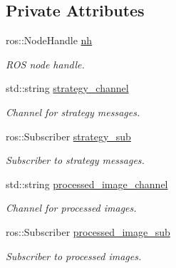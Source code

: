 \subsection*{Private Attributes}
\begin{DoxyCompactItemize}
\item 
\mbox{\label{classMappingNode_a139d9714856342de62b712b6e114a2ea}} 
ros\+::\+Node\+Handle \hyperlink{classMappingNode_a139d9714856342de62b712b6e114a2ea}{nh}
\begin{DoxyCompactList}\small\item\em R\+OS node handle. \end{DoxyCompactList}\item 
\mbox{\label{classMappingNode_af35bfe4546a06ed5f9d4e06a71b706fa}} 
std\+::string \hyperlink{classMappingNode_af35bfe4546a06ed5f9d4e06a71b706fa}{strategy\+\_\+channel}
\begin{DoxyCompactList}\small\item\em Channel for strategy messages. \end{DoxyCompactList}\item 
\mbox{\label{classMappingNode_a3f21681b24d45f02e4e73958367147db}} 
ros\+::\+Subscriber \hyperlink{classMappingNode_a3f21681b24d45f02e4e73958367147db}{strategy\+\_\+sub}
\begin{DoxyCompactList}\small\item\em Subscriber to strategy messages. \end{DoxyCompactList}\item 
\mbox{\label{classMappingNode_a1f67492ac5c1df268061350d038c2bec}} 
std\+::string \hyperlink{classMappingNode_a1f67492ac5c1df268061350d038c2bec}{processed\+\_\+image\+\_\+channel}
\begin{DoxyCompactList}\small\item\em Channel for processed images. \end{DoxyCompactList}\item 
\mbox{\label{classMappingNode_accf8f357a71da4fe46d2ffadb300dc93}} 
ros\+::\+Subscriber \hyperlink{classMappingNode_accf8f357a71da4fe46d2ffadb300dc93}{processed\+\_\+image\+\_\+sub}
\begin{DoxyCompactList}\small\item\em Subscriber to processed images. \end{DoxyCompactList}\item 

\end{DoxyCompactItemize}
